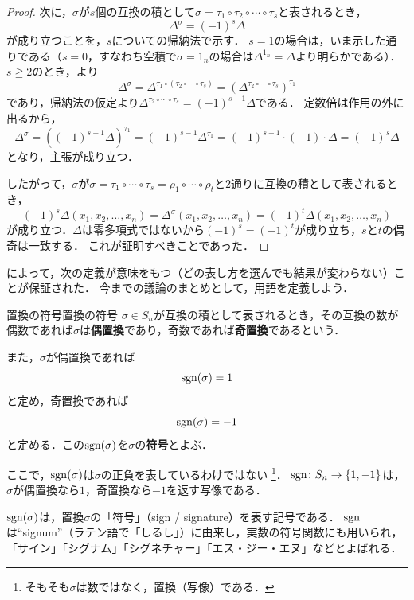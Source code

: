 \begin{tleftbar}
\begin{proof}
  次に，$\sigma$が$s$個の互換の積として$\sigma = \tau_1 \circ \tau_2 \circ \cdots \circ \tau_s$と表されるとき，
  \[
    \Delta^{\sigma} = (-1)^s \Delta
  \]
  が成り立つことを，$s$についての帰納法で示す．
  $s = 1$の場合は，いま示した通りである（$s = 0$，すなわち空積で$\sigma = 1_n$の場合は$\Delta^{1_n} = \Delta$より明らかである）．
  $s \geqq 2$のとき，より
  \[
    \Delta^{\sigma}
    = \Delta^{\tau_1 \circ (\tau_2 \circ \cdots \circ \tau_s)}
    = \left( \Delta^{\tau_2 \circ \cdots \circ \tau_s} \right)^{\tau_1}
  \]
  であり，帰納法の仮定より$\Delta^{\tau_2 \circ \cdots \circ \tau_s} = (-1)^{s-1}\Delta$である．
  定数倍は作用の外に出るから，
  \[
    \Delta^{\sigma}
    = \left( (-1)^{s-1}\Delta \right)^{\tau_1}
    = (-1)^{s-1}\Delta^{\tau_1}
    = (-1)^{s-1} \cdot (-1) \cdot \Delta
    = (-1)^s \Delta
  \]
  となり，主張が成り立つ．

  したがって，$\sigma$が$\sigma = \tau_1 \circ \cdots \circ \tau_s = \rho_1 \circ \cdots \circ \rho_t$と$2$通りに互換の積として表されるとき，
  \[
  (-1)^s \Delta (x_1, x_2, \dots, x_n)
  = \Delta^{\sigma} (x_1, x_2, \dots, x_n)
  = (-1)^t \Delta (x_1, x_2, \dots, x_n)
  \]
  が成り立つ．$\Delta$は零多項式ではないから$(-1)^s = (-1)^t$が成り立ち，$s$と$t$の偶奇は一致する．
  これが証明すべきことであった．
\end{proof}
\end{tleftbar}

によって，次の定義が意味をもつ（どの表し方を選んでも結果が変わらない）ことが保証された．
今までの議論のまとめとして，用語を定義しよう．

\begin{definition}{置換の符号}{置換の符号}
  $\sigma \in S_n$が互換の積として表されるとき，その互換の数が偶数であれば$\sigma$は\textbf{偶置換}であり，奇数であれば\textbf{奇置換}であるという．
  
  また，$\sigma$が偶置換であれば
  \[
  \operatorname{sgn}(\sigma) = 1
  \]
  と定め，奇置換であれば
  \[
  \operatorname{sgn}(\sigma) = -1
  \]
  と定める．この$\operatorname{sgn}(\sigma)$を$\sigma$の\textbf{符号}とよぶ．
\end{definition}

ここで，$\operatorname{sgn}(\sigma)$は$\sigma$の正負を表しているわけではない
\footnote{そもそも$\sigma$は数ではなく，置換（写像）である．}．
$\operatorname{sgn} \colon S_n \to \{1,-1\}$は，$\sigma$が偶置換なら$1$，奇置換なら$-1$を返す写像である．

\begin{mycolumn}
  $\operatorname{sgn}(\sigma)$は，置換$\sigma$の「符号」（sign / signature）を表す記号である．
  $\operatorname{sgn}$は``signum''（ラテン語で「しるし」）に由来し，実数の符号関数にも用いられ，「サイン」「シグナム」「シグネチャー」「エス・ジー・エヌ」などとよばれる．
\end{mycolumn}

